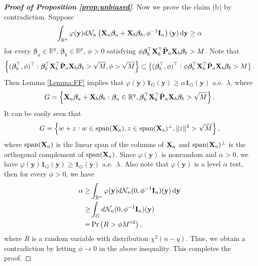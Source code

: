 \documentclass[bj]{imsart}
\newcommand{\By}{\mathbf{y}}    \newcommand{\Bz}{\mathbf{z}}
\newcommand{\bfsym}[1]{\ensuremath{\boldsymbol{#1}}}
\def\bbeta{\bfsym \beta}
\theoremstyle{plain}
\theoremstyle{definition}
\theoremstyle{remark}
\begin{document}
\begin{proof}[\textbf{Proof of Proposition \ref{prop:unbiased}}]
    Now we prove the claim (b) by contradiction.
    Suppose
    \begin{equation*}
        \int_{\mathbb R^n} \varphi(\By) d\mathcal N_n \left(\BX_a \bbeta_a + \BX_b \bbeta_b,\phi^{-1} \BI_n\right) (\By)\, \mathrm{d}\By 
        \geq \alpha 
    \end{equation*}
    for every $\bbeta_a\in \mathbb R^q$, $\bbeta_b \in \mathbb R^p$, $\phi>0$ satisfying $\phi \bbeta_b^\top \BX_b^\top \tilde \BP_a \BX_b \bbeta_b >M$.
    Note that
    \begin{equation*}
        \left\{(\bbeta_b^\top, \phi)^\top :  \bbeta_b^\top \BX_b^\top \tilde\BP_a \BX_b \bbeta_b >\sqrt M,\phi>\sqrt M \right\} 
        \subset
        \left\{(\bbeta_b^\top, \phi)^\top :  \phi\bbeta_b^\top \BX_b^\top \tilde\BP_a \BX_b \bbeta_b > M\right\} .
    \end{equation*}
    Then Lemma \ref{Lemma:FF} implies that $\varphi(\By) \mathbf 1_{G}(\By)\geq \alpha \mathbf 1_{G}(\By)$ a.e.\ $\lambda$, where 
    \begin{equation*}
        G=\left\{ \BX_a \bbeta_a + \BX_b \bbeta_b:  \bbeta_a \in \mathbb R^{q},
        \bbeta_b^\top \BX_b^\top \tilde \BP_a \BX_b \bbeta_b >\sqrt M
    \right\}.
    \end{equation*}
    It can be easily seen that
    \begin{equation*}
        G=\left\{
            w+z: w\in \textrm{span}(\BX_a), z \in \textrm{span}(\BX_a)^{\bot},
            \|z\|^2 > \sqrt{M}
        \right\},
    \end{equation*}
    where $\textrm{span}(\mathbf{X}_a)$ is the linear span of the columns of $\mathbf{X}_a$ and $\textrm{span}(\mathbf{X}_a)^\bot$ is the orthogonal complement of $\textrm{span}(\mathbf{X}_a)$.
    Since $\varphi(\By)$ is nonrandom and $\alpha>0$, we have $\varphi(\By) \mathbf 1_{G}(\By)\geq \mathbf 1_{G}(\By)$ a.e.\ $\lambda$.
    Also note that $\varphi(\By)$ is a level $\alpha$ test, then for every $\phi>0$, we have
    \begin{equation*}
        \begin{split}
            \alpha \geq&
        \int_{\mathbb R^n} \varphi(\By) d\mathcal N_n (0,\phi^{-1} \BI_n)(\By) \,\mathrm{d} \By
        \\
        \geq& 
        \int_{G} d\mathcal N_n (0,\phi^{-1} \BI_n)(\By) 
        \\
        =&\Pr\left( 
            R > \phi M^{*2}
        \right),
        \end{split}
    \end{equation*}
    where $R$ is a random variable with distribution $\chi^2(n-q)$.
    Thus, we obtain a contradiction by letting $\phi\to 0$ in the above inequality.
    This completes the proof.

\end{proof}
\end{document}
